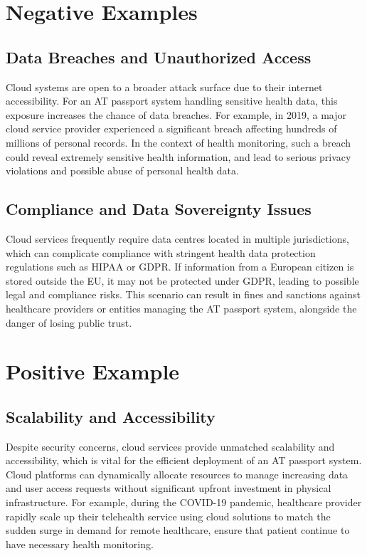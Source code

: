 \section{Negative Examples}
\subsection{Data Breaches and Unauthorized Access}
Cloud systems are open to a broader attack surface due to their internet
accessibility. For an AT passport system handling sensitive health data, this
exposure increases the chance of data breaches. For example, in 2019, a major
cloud service provider experienced a significant breach affecting hundreds of
millions of personal records. In the context of health monitoring, such a breach
could reveal extremely sensitive health information, and lead to serious privacy
violations and possible abuse of personal health data.

\subsection{Compliance and Data Sovereignty Issues}
Cloud services frequently require data centres located in multiple
jurisdictions, which can complicate compliance with stringent health data
protection regulations such as HIPAA or GDPR. If information from a European
citizen is stored outside the EU, it may not be protected under GDPR, leading to
possible legal and compliance risks. This scenario can result in fines and
sanctions against healthcare providers or entities managing the AT passport
system, alongside the danger of losing public trust.

\section{Positive Example}
\subsection{Scalability and Accessibility}
Despite security concerns, cloud services provide unmatched scalability and
accessibility, which is vital for the efficient deployment of an AT passport
system. Cloud platforms can dynamically allocate resources to manage increasing
data and user access requests without significant upfront investment in physical
infrastructure. For example, during the COVID-19 pandemic, healthcare provider
rapidly scale up their telehealth service using cloud solutions to match the
sudden surge in demand for remote healthcare, ensure that patient continue to
have necessary health monitoring.

